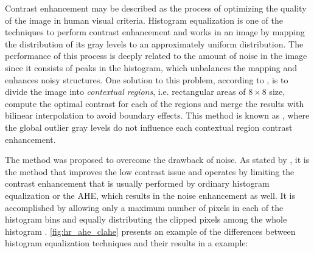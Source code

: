 Contrast enhancement may be described as the process of optimizing the quality of the image in human visual criteria. Histogram equalization is one of the techniques to perform contrast enhancement and works in an image by mapping the distribution of its gray levels to an approximately uniform distribution. The performance of this process is deeply related to the amount of noise in the image since it consists of peaks in the histogram, which unbalances the mapping and enhances noisy structures. One solution to this problem, according to , is to divide the image into \emph{contextual regions}, i.e. rectangular areas of $8 \times 8$ size, compute the optimal contrast for each of the regions and merge the results with bilinear interpolation to avoid boundary effects. This method is known as , where the global outlier gray levels do not influence each contextual region contrast enhancement.

The  method was proposed to overcome the drawback of noise. As stated by , it is the method that improves the low contrast issue and operates by limiting the contrast enhancement that is usually performed by ordinary histogram equalization or the AHE, which results in the noise enhancement as well. It is accomplished by allowing only a maximum number of pixels in each of the histogram bins and equally distributing the clipped pixels among the whole histogram \cite{zuiderveld1994constrast}. \autoref{fig:hr_ahe_clahe} presents an example of the differences between histogram equalization techniques and their results in a  example:

